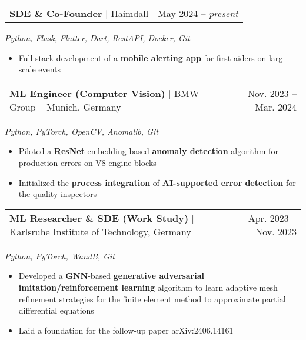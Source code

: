 \documentclass[letterpaper,11pt]{article}
\makeatletter
\newcommand{\resumeItem}[1]{
  \item\small{
    {#1 \vspace{-2pt}}
  }
}
\newcommand{\resumeProjectHeading}[2]{
    \item
    \begin{tabular*}{0.97\textwidth}{l@{\extracolsep{\fill}}r}
      \small#1 & #2 \\
    \end{tabular*}\vspace{-7pt}
}
\newcommand{\resumeItemListStart}{\begin{itemize}[leftmargin=0.2in]}
\newcommand{\resumeItemListEnd}{\end{itemize}\vspace{-5pt}}
\makeatother
\begin{document}
\vspace{12pt}

\resumeProjectHeading
{\textbf{SDE \& Co-Founder} \space $|$ \space Haimdall \space  [haimdall.org] \space \vspace{8pt}}{May 2024 -- \textit{present}}
\textit{\small{Python, Flask, Flutter, Dart, RestAPI, Docker, Git}}
\vspace*{-5pt}
\resumeItemListStart
\resumeItem{Full-stack development of a \textbf{mobile alerting app} for first aiders on larg-scale events}
\resumeItemListEnd

\vspace{12pt}
\resumeProjectHeading
{\textbf{ML Engineer (Computer Vision)} \space $|$ \space BMW Group -- Munich, Germany\vspace{8pt}}{Nov. 2023 -- Mar. 2024}
\textit{\small{Python, PyTorch, OpenCV, Anomalib, Git}}
\vspace*{-5pt}
\resumeItemListStart
\resumeItem{Piloted a \textbf{ResNet} embedding-based \textbf{anomaly detection} algorithm for production errors on V8 engine blocks}
\resumeItem{Initialized the \textbf{process integration} of \textbf{AI-supported error detection} for the quality inspectors}
\resumeItemListEnd

\vspace{12pt}
\resumeProjectHeading
{\textbf{ML Researcher \& SDE (Work Study)} \space $|$ \space Karlsruhe Institute of Technology, Germany\vspace{8pt}}{Apr. 2023 -- Nov. 2023}
\textit{\small{Python, PyTorch, WandB, Git}}
\vspace*{-5pt}
\resumeItemListStart
\resumeItem{Developed a \textbf{GNN}-based \textbf{generative adversarial imitation/reinforcement learning} algorithm to learn adaptive mesh refinement strategies for the finite element method to approximate partial differential equations}
\resumeItem{Laid a foundation for the follow-up paper arXiv:2406.14161}
\resumeItemListEnd
\end{document}
